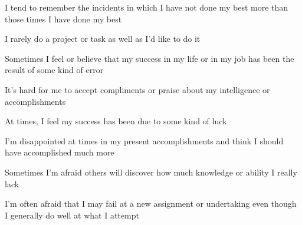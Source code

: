 \documentclass[aspectratio=169]{beamer}
\begin{document}
\begin{frame}
  \begin{center}
    \Huge I tend to remember the incidents in which I have not done my best more than those times I have done my best
  \end{center}
\end{frame}

\begin{frame}
  \begin{center}
    \Huge  I rarely do a project or task as well as I’d like to do it
  \end{center}
\end{frame}

\begin{frame}
  \begin{center}
    \Huge  Sometimes I feel or believe that my success in my life or in my job has been the result of some kind of error
  \end{center}
\end{frame}

\begin{frame}
  \begin{center}
    \Huge    It’s  hard  for  me  to  accept  compliments  or  praise  about  my  intelligence  or  accomplishments
  \end{center}
\end{frame}

\begin{frame}
  \begin{center}
    \Huge At times, I feel my success has been due to some kind of luck
  \end{center}
\end{frame}

\begin{frame}
  \begin{center}
    \Huge   I’m  disappointed  at  times  in  my  present  accomplishments  and  think  I should have accomplished much more
  \end{center}
\end{frame}

\begin{frame}
  \begin{center}
    \Huge   Sometimes I’m afraid others will discover how much knowledge or ability I really lack
  \end{center}
\end{frame}

\begin{frame}
  \begin{center}
    \Huge     I’m  often  afraid  that  I  may  fail  at  a  new  assignment  or  undertaking  even  though  I  generally  do  well  at  what  I
    attempt
  \end{center}
\end{frame}
\end{document}
